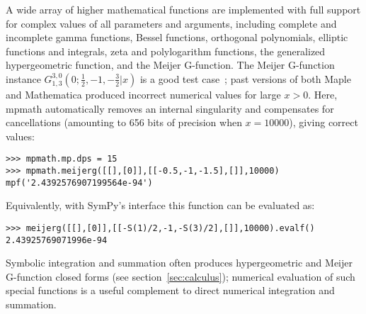 A wide array of higher mathematical functions are implemented
with full support for complex values of all parameters and arguments,
including complete and incomplete gamma functions,
Bessel functions, orthogonal polynomials, elliptic functions and integrals,
zeta and polylogarithm functions,
the generalized hypergeometric function, and the Meijer G-function.
The Meijer G-function instance
$G_{1, 3}^{3, 0}\left(0 ; \tfrac{1}{2}, -1, - \tfrac{3}{2} | x \right)$
is a good test case~\cite{Toth2007}; past versions of both Maple and
Mathematica produced incorrect numerical values for large $x > 0$.
Here, mpmath automatically removes an internal singularity
and compensates for cancellations (amounting to 656 bits
of precision when $x = 10000$), giving correct values:
\begin{verbatim}
>>> mpmath.mp.dps = 15
>>> mpmath.meijerg([[],[0]],[[-0.5,-1,-1.5],[]],10000)
mpf('2.4392576907199564e-94')
\end{verbatim}

Equivalently, with SymPy's interface this function can be evaluated as:
\begin{verbatim}
>>> meijerg([[],[0]],[[-S(1)/2,-1,-S(3)/2],[]],10000).evalf()
2.43925769071996e-94
\end{verbatim}

Symbolic integration and summation often produces hypergeometric
and Meijer G-function closed forms (see section~\ref{sec:calculus});
numerical evaluation of such special functions is a useful complement
to direct numerical integration and summation.

